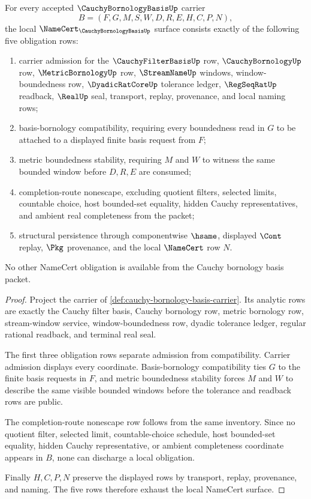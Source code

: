 \begin{theorem}
\label{thm:cauchy-bornology-basis-namecert-obligations}
For every accepted $\CauchyBornologyBasisUp$ carrier
$$
B=(F,G,M,S,W,D,R,E,H,C,P,N),
$$
the local $\NameCert_{\CauchyBornologyBasisUp}$ surface consists exactly of the following five obligation rows:
\begin{enumerate}
\item carrier admission for the $\CauchyFilterBasisUp$ row, $\CauchyBornologyUp$ row, $\MetricBornologyUp$ row, $\StreamNameUp$ windows, window-boundedness row, $\DyadicRatCoreUp$ tolerance ledger, $\RegSeqRatUp$ readback, $\RealUp$ seal, transport, replay, provenance, and local naming rows;
\item basis-bornology compatibility, requiring every boundedness read in $G$ to be attached to a displayed finite basis request from $F$;
\item metric boundedness stability, requiring $M$ and $W$ to witness the same bounded window before $D,R,E$ are consumed;
\item completion-route nonescape, excluding quotient filters, selected limits, countable choice, host bounded-set equality, hidden Cauchy representatives, and ambient real completeness from the packet;
\item structural persistence through componentwise $\hsame$, displayed $\Cont$ replay, $\Pkg$ provenance, and the local $\NameCert$ row $N$.
\end{enumerate}
No other NameCert obligation is available from the Cauchy bornology basis packet.
\end{theorem}
\begin{proof}
Project the carrier of \autoref{def:cauchy-bornology-basis-carrier}. Its analytic rows are exactly the Cauchy filter basis, Cauchy bornology row, metric bornology row, stream-window service, window-boundedness row, dyadic tolerance ledger, regular rational readback, and terminal real seal.

The first three obligation rows separate admission from compatibility. Carrier admission displays every coordinate. Basis-bornology compatibility ties $G$ to the finite basis requests in $F$, and metric boundedness stability forces $M$ and $W$ to describe the same visible bounded windows before the tolerance and readback rows are public.

The completion-route nonescape row follows from the same inventory. Since no quotient filter, selected limit, countable-choice schedule, host bounded-set equality, hidden Cauchy representative, or ambient completeness coordinate appears in $B$, none can discharge a local obligation.

Finally $H,C,P,N$ preserve the displayed rows by transport, replay, provenance, and naming. The five rows therefore exhaust the local NameCert surface.
\end{proof}

